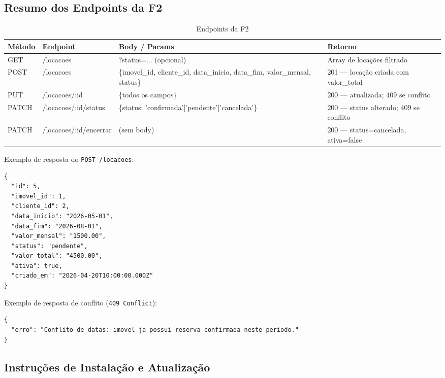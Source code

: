 \documentclass[12pt, a4paper]{article}
\newcommand{\thead}[1]{\cellcolor{tableheader}\color{white}\bfseries #1}
\newcommand{\talt}{\rowcolor{tablerowalt}}
\begin{document}
\subsection{Resumo dos Endpoints da F2}

\begin{table}[H]
\centering
\begin{tabularx}{\textwidth}{|l|l|l|X|}
\hline
\thead{Método} & \thead{Endpoint} & \thead{Body / Params} & \thead{Retorno} \\
\hline
GET   & /locacoes              & ?status=... (opcional)                                 & Array de locações filtrado \\
\talt POST  & /locacoes              & \{imovel\_id, cliente\_id, data\_inicio, data\_fim, valor\_mensal, status\} & 201 — locação criada com valor\_total \\
PUT   & /locacoes/:id          & \{todos os campos\}                                    & 200 — atualizada; 409 se conflito \\
\talt PATCH & /locacoes/:id/status   & \{status: 'confirmada'|'pendente'|'cancelada'\}        & 200 — status alterado; 409 se conflito \\
PATCH & /locacoes/:id/encerrar & (sem body)                                             & 200 — status=cancelada, ativa=false \\
\hline
\end{tabularx}
\caption{Endpoints da F2}
\end{table}

Exemplo de resposta do \texttt{POST /locacoes}:

\begin{lstlisting}[language=JavaScript2]
{
  "id": 5,
  "imovel_id": 1,
  "cliente_id": 2,
  "data_inicio": "2026-05-01",
  "data_fim": "2026-08-01",
  "valor_mensal": "1500.00",
  "status": "pendente",
  "valor_total": "4500.00",
  "ativa": true,
  "criado_em": "2026-04-20T10:00:00.000Z"
}
\end{lstlisting}

Exemplo de resposta de conflito (\texttt{409 Conflict}):

\begin{lstlisting}[language=JavaScript2]
{
  "erro": "Conflito de datas: imovel ja possui reserva confirmada neste periodo."
}
\end{lstlisting}

\subsection{Instruções de Instalação e Atualização}
\end{document}
